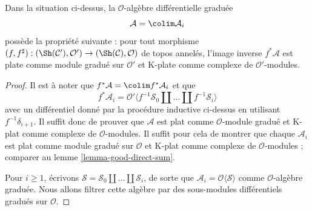 \begin{lemma}
\label{lemma-special-good}
Dans la situation ci-dessus, la $\mathcal{O}$-algèbre différentielle graduée
$$
\mathcal{A} = \colim \mathcal{A}_i
$$
possède la propriété suivante : pour tout morphisme $(f, f^\sharp) : (\Sh(\mathcal{C}'), \mathcal{O}') \to (\Sh(\mathcal{C}), \mathcal{O})$ de topos annelés, l'image inverse $f^*\mathcal{A}$ est plate comme module gradué sur $\mathcal{O}'$ et K-plate comme complexe de $\mathcal{O}'$-modules.
\end{lemma}

\begin{proof}
Il est à noter que $f^*\mathcal{A} = \colim f^*\mathcal{A}_i$ et que
$$
f^*\mathcal{A}_i = \mathcal{O}'\langle
f^{-1}\mathcal{S}_0 \amalg \ldots \amalg f^{-1}\mathcal{S}_i\rangle
$$
avec un différentiel donné par la procédure inductive ci-dessus en utilisant $f^{-1}\delta_{i + 1}$.
Il suffit donc de prouver que $\mathcal{A}$ est plat comme $\mathcal{O}$-module gradué et K-plat comme complexe de $\mathcal{O}$-modules.
Il suffit pour cela de montrer que chaque $\mathcal{A}_i$ est plat comme module gradué sur $\mathcal{O}$ et K-plat comme complexe de $\mathcal{O}$-modules ; comparer au lemme \ref{lemma-good-direct-sum}.


\medskip\noindent
Pour $i \geq 1$, écrivons $\mathcal{S} = \mathcal{S}_0 \amalg \ldots \amalg \mathcal{S}_i$, de sorte que $\mathcal{A}_i = \mathcal{O}\langle \mathcal{S} \rangle$ comme $\mathcal{O}$-algèbre graduée.
Nous allons filtrer cette algèbre par des sous-modules différentiels gradués sur $\mathcal{O}$.


\end{proof}
